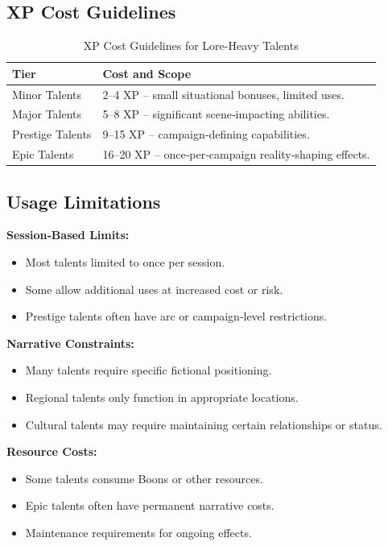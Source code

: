 \subsection{XP Cost Guidelines}\label{subsec:xp_guidelines}

\begin{longtable}{p{4cm} p{9cm}}
\caption{XP Cost Guidelines for Lore-Heavy Talents}\label{tab:lore_xp_costs}\\
\toprule
\textbf{Tier} & \textbf{Cost and Scope} \\
\midrule
Minor Talents & 2--4 XP -- small situational bonuses, limited uses. \\
Major Talents & 5--8 XP -- significant scene‑impacting abilities. \\
Prestige Talents & 9--15 XP -- campaign‑defining capabilities. \\
Epic Talents & 16--20 XP -- once‑per‑campaign reality‑shaping effects. \\
\bottomrule
\end{longtable}

\subsection{Usage Limitations}\label{subsec:usage_limitations}

\textbf{Session‑Based Limits:}
\begin{itemize}
    \item Most talents limited to once per session.
    \item Some allow additional uses at increased cost or risk.
    \item Prestige talents often have arc or campaign‑level restrictions.
\end{itemize}

\textbf{Narrative Constraints:}
\begin{itemize}
    \item Many talents require specific fictional positioning.
    \item Regional talents only function in appropriate locations.
    \item Cultural talents may require maintaining certain relationships or status.
\end{itemize}

\textbf{Resource Costs:}
\begin{itemize}
    \item Some talents consume Boons or other resources.
    \item Epic talents often have permanent narrative costs.
    \item Maintenance requirements for ongoing effects.
\end{itemize}

